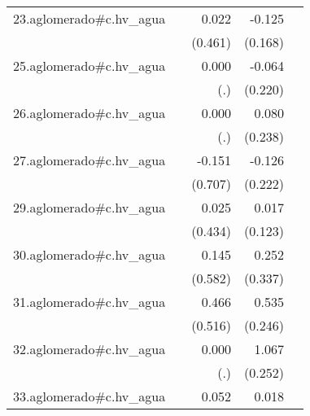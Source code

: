 {\begin{longtable}{l*{4}{D{.}{.}{-1}}}
\addlinespace
23.aglomerado#c.hv\_agua&                     &       0.022         &      -0.125         &                     \\
            &                     &     (0.461)         &     (0.168)         &                     \\
\addlinespace
25.aglomerado#c.hv\_agua&                     &       0.000         &      -0.064         &                     \\
            &                     &         (.)         &     (0.220)         &                     \\
\addlinespace
26.aglomerado#c.hv\_agua&                     &       0.000         &       0.080         &                     \\
            &                     &         (.)         &     (0.238)         &                     \\
\addlinespace
27.aglomerado#c.hv\_agua&                     &      -0.151         &      -0.126         &                     \\
            &                     &     (0.707)         &     (0.222)         &                     \\
\addlinespace
29.aglomerado#c.hv\_agua&                     &       0.025         &       0.017         &                     \\
            &                     &     (0.434)         &     (0.123)         &                     \\
\addlinespace
30.aglomerado#c.hv\_agua&                     &       0.145         &       0.252         &                     \\
            &                     &     (0.582)         &     (0.337)         &                     \\
\addlinespace
31.aglomerado#c.hv\_agua&                     &       0.466         &       0.535\sym{*}  &                     \\
            &                     &     (0.516)         &     (0.246)         &                     \\
\addlinespace
32.aglomerado#c.hv\_agua&                     &       0.000         &       1.067\sym{***}&                     \\
            &                     &         (.)         &     (0.252)         &                     \\
\addlinespace
33.aglomerado#c.hv\_agua&                     &       0.052         &       0.018         &                     \\

\end{longtable}}
